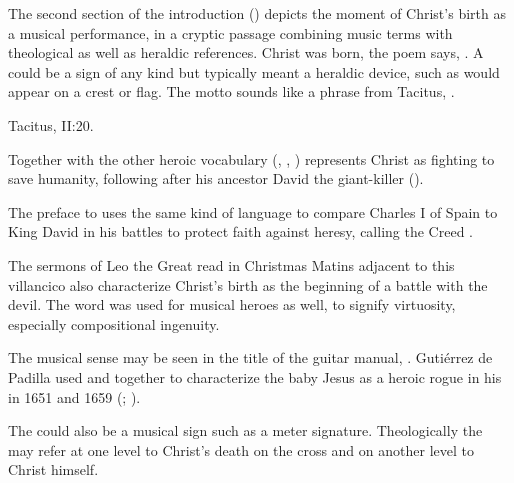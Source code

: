 The second section of the introduction () depicts the moment
of Christ's birth as a musical performance,  in a cryptic passage combining
music terms with theological as well as heraldic references.
Christ was born, the poem says, .
A  could be a sign of any kind but typically meant a heraldic
device, such as would appear on a crest or flag.%
    \Autocite[]{Covarrubias:Tesoro}
The motto  sounds like a phrase from
Tacitus, .%
\begin{Footnote}
    Tacitus,  II:20.
\end{Footnote}
Together with the other heroic vocabulary (,
, ) represents Christ as fighting to save
humanity, following after his ancestor David the giant-killer
().%
\begin{Footnote}
    The preface to \autocite{Azevedo:Catecismo} uses the same kind of language
    to compare Charles I of Spain to King David in his battles to protect faith
    against heresy, calling the Creed .
\end{Footnote}
The sermons of Leo the Great read in Christmas Matins adjacent to this
villancico also characterize Christ's birth as the beginning of a battle with
the devil.
The word  was used for musical heroes as well, to signify
virtuosity, especially compositional ingenuity.%
\begin{Footnote}
    \Autocite[]{Covarrubias:Tesoro}
    The musical sense may be seen in the title of the guitar manual,
    \autocite{Sanz:Guitarra}.
    Gutiérrez de Padilla used  and  together
    to characterize the baby Jesus as a heroic rogue in his  in
    1651 and 1659 (; ).
\end{Footnote}
The  could also be a musical sign such as a meter signature.
Theologically the  may refer at one level to Christ's death on the
cross and on another level to Christ himself.

